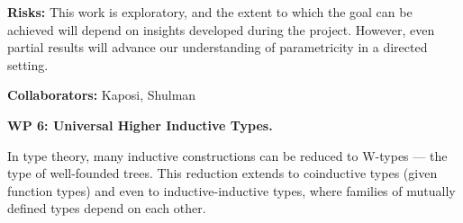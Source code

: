 \documentclass[a4paper,11pt]{article}
\renewcommand{\paragraph}[1]{\textbf{#1.}}
\begin{document}
\textbf{Risks:} This work is exploratory, and the extent to which the
goal can be achieved will depend on insights developed during the
project. However, even partial results will advance our understanding
of parametricity in a directed setting.

\textbf{Collaborators:} Kaposi, Shulman





\paragraph{WP 6: Universal Higher Inductive Types}

In type theory, many inductive constructions can be reduced to W-types
— the type of well-founded trees. This reduction extends to
coinductive types (given function types) and even to
inductive-inductive types, where families of mutually defined types
depend on each other.
\end{document}
